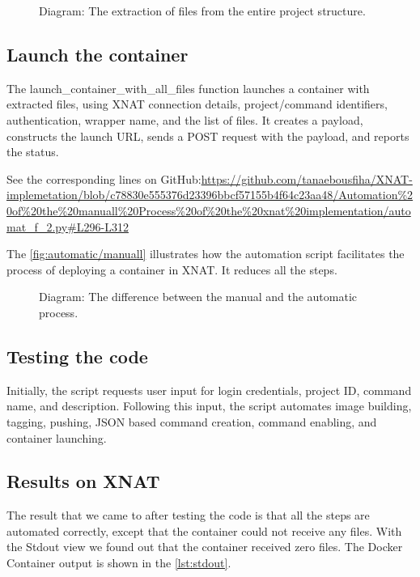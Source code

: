 \begin{figure}[H]
    \centering
    \def\svgwidth{0.7\linewidth}
    
    \caption{Diagram: The extraction of files from the entire project structure.}
    \label{fig:extraction}
\end{figure}

\subsection{Launch the container}

The launch\_container\_with\_all\_files function launches a container with extracted files, using XNAT connection details, project/command identifiers, authentication, wrapper name, and the list of files. It creates a payload, constructs the launch URL, sends a POST request with the payload, and reports the status.



\noindent\footnotesize See the corresponding lines on GitHub:\url{https://github.com/tanaebousfiha/XNAT-implemetation/blob/c78830e555376d23396bbcf57155b4f64c23aa48/Automation%20of%20the%20manuall%20Process%20of%20the%20xnat%20implementation/automat_f_2.py#L296-L312}
\normalsize


The \autoref{fig:automatic/manuall} illustrates how the automation script facilitates the process of deploying a container in XNAT. It reduces all the steps.

\begin{figure}[H]
    \centering
    \def\svgwidth{0.8\linewidth}
    
    \caption{Diagram: The difference between the manual and the automatic process.}
    \label{fig:automatic/manuall}
\end{figure}



\subsection{Testing the code}
Initially, the script requests user input for login credentials, project ID, command name, and description. Following this input, the script automates image building, tagging, pushing, JSON based command creation, command enabling, and container launching.

\subsection{Results on XNAT}
The result that we came to after testing the code is that all the steps are automated correctly, except that the container could not receive any files. With the \ac{Stdout} view we found out that the container received zero files. The Docker Container output is shown in the \autoref{lst:stdout}.
 
